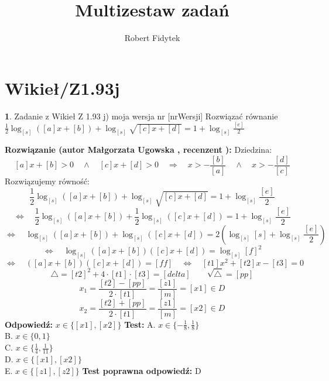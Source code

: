 \documentclass[12pt, a4paper]{article}
\title{Multizestaw zadań}
\author{Robert Fidytek}
\date{}
\theoremstyle{definition} %
\newtheorem{zad}{}
\newcommand{\kategoria}[1]{\section{#1}} %
\newcommand{\zadStart}[1]{\begin{zad}#1\newline} %
\newcommand{\zadStop}{\end{zad}}   %
\newcommand{\rozwStart}[2]{\noindent \textbf{Rozwiązanie (autor #1 , recenzent #2): }\newline} %
\newcommand{\rozwStop}{\newline}                                            %
\newcommand{\odpStart}{\noindent \textbf{Odpowiedź:}\newline}    %
\newcommand{\odpStop}{\newline}                                             %
\newcommand{\testStart}{\noindent \textbf{Test:}\newline} %
\newcommand{\testStop}{\newline} %
\newcommand{\kluczStart}{\noindent \textbf{Test poprawna odpowiedź:}\newline} %
\newcommand{\kluczStop}{\newline} %
\begin{document}
\maketitle


\kategoria{Wikieł/Z1.93j}
\zadStart{Zadanie z Wikieł Z 1.93 j) moja wersja nr [nrWersji]}
Rozwiązać równanie $\frac{1}{2} \log_{[s]}{([a]x+[b])} + \log_{[s]}{\sqrt{[c]x+[d]}}  = 1 + \log_{[s]}{\frac{[e]}{2}} $
\zadStop
\rozwStart{Małgorzata Ugowska}{}
Dziedzina:
$$[a]x+[b] > 0 \quad \land \quad [c]x+[d] > 0 \quad \Longrightarrow \quad x > -\frac{[b]}{[a]} \quad \land \quad x > -\frac{[d]}{[c]}$$
Rozwiązujemy równo\'sć:
$$ \frac{1}{2} \log_{[s]}{([a]x+[b])} + \log_{[s]}{\sqrt{[c]x+[d]}}  = 1 + \log_{[s]}{\frac{[e]}{2}} $$
$$ \Longleftrightarrow \quad \frac{1}{2} \log_{[s]}{([a]x+[b])} + \frac{1}{2} \log_{[s]}{([c]x+[d])}  = 1 + \log_{[s]}{\frac{[e]}{2}}$$
$$ \Longleftrightarrow \quad \log_{[s]}{([a]x+[b])} + \log_{[s]}{([c]x+[d])}  = 2(\log_{[s]}{[s]} + \log_{[s]}{\frac{[e]}{2}}) $$
$$ \Longleftrightarrow \quad \log_{[s]}{([a]x+[b])([c]x+[d])}  = \log_{[s]}{[f]^2} $$
$$ \Longleftrightarrow \quad ([a]x+[b])([c]x+[d]) = [ff] \quad \Longleftrightarrow \quad [t1] x^2 +[t2] x - [t3]=0 $$
$$ \bigtriangleup =[t2]^2+4 \cdot [t1] \cdot [t3] = [delta] \qquad \sqrt{\bigtriangleup} = [pp]$$
$$ x_1 = \frac{[t2]-[pp]}{2 \cdot [t1]} = \frac{[z1]}{[m]} = [x1] \in D$$
$$ x_2 = \frac{[t2]+[pp]}{2 \cdot [t1]} = \frac{[z1]}{[m]} = [x2] \in D$$
\rozwStop
\odpStart
$x \in \{[x1], [x2]\}$
\odpStop
\testStart
A. $x \in \{-\frac{1}{8}, \frac{1}{8}\}$\\
B. $x \in \{0, 1\}$\\
C. $x \in \{\frac{1}{4}, \frac{1}{11}\}$\\
D. $x \in \{[x1], [x2]\}$\\
E. $x \in \{[z1], [z2]\}$
\testStop
\kluczStart
D
\kluczStop
\end{document}

